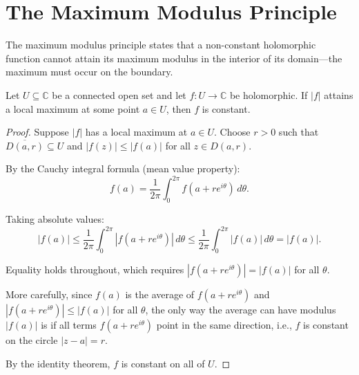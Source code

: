 \section{The Maximum Modulus Principle}

The maximum modulus principle states that a non-constant holomorphic function cannot attain its maximum modulus in the interior of its domain---the maximum must occur on the boundary.

\begin{theorem}
  Let $U \subseteq \mathbb{C}$ be a connected open set and let $f : U \to \mathbb{C}$ be holomorphic.
  If $|f|$ attains a local maximum at some point $a \in U$, then $f$ is constant.
\end{theorem}

\begin{center}
\end{center}

\begin{proof}
  Suppose $|f|$ has a local maximum at $a \in U$. Choose $r > 0$ such that $\overline{D(a,r)} \subseteq U$ and $|f(z)| \leq |f(a)|$ for all $z \in D(a,r)$.

  By the Cauchy integral formula (mean value property):
  \[
    f(a) = \frac{1}{2\pi} \int_0^{2\pi} f(a + re^{i\theta}) \, d\theta.
  \]

  Taking absolute values:
  \[
    |f(a)| \leq \frac{1}{2\pi} \int_0^{2\pi} |f(a + re^{i\theta})| \, d\theta \leq \frac{1}{2\pi} \int_0^{2\pi} |f(a)| \, d\theta = |f(a)|.
  \]

  Equality holds throughout, which requires $|f(a + re^{i\theta})| = |f(a)|$ for all $\theta$.

  More carefully, since $f(a)$ is the average of $f(a + re^{i\theta})$ and $|f(a + re^{i\theta})| \leq |f(a)|$ for all $\theta$, the only way the average can have modulus $|f(a)|$ is if all terms $f(a + re^{i\theta})$ point in the same direction, i.e., $f$ is constant on the circle $|z-a| = r$.

  By the identity theorem, $f$ is constant on all of $U$.
\end{proof}

